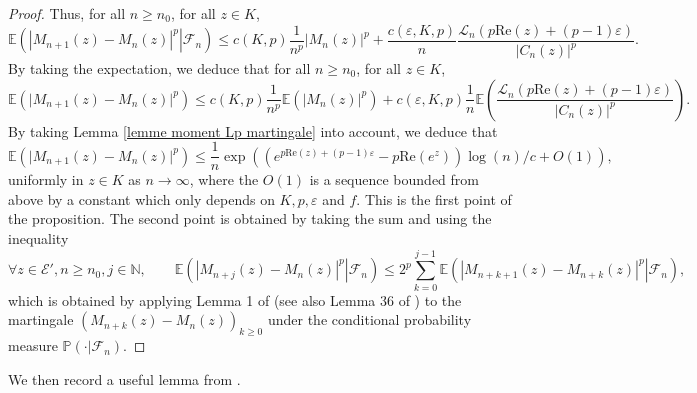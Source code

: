 \documentclass[11pt]{article}
\numberwithin{equation}{section}
\def\vp{\varepsilon}
\def \N{\mathbb{N}}
\def \cL{\mathcal{L}}
\def\E{\mathbb{E}}
\def\P{\mathbb{P}}
\renewcommand{\Re}{\mathrm{Re}}
\begin{document}
\begin{proof}
	Thus, for all $n \ge n_0$, for all $z \in K$,
	\begin{equation}\label{eq majoration moment conditionnel increment}
	\E\left( \left. \left\vert M_{n+1}(z)-M_n(z) \right\vert^p  \right\vert \mathcal{F}_n\right)\le c(K,p) \frac{1}{n^p} \vert M_n(z) \vert^p + \frac{c(\vp, K, p)}{n} \frac{\cL_n(p\Re(z)+(p-1)\vp)}{\vert C_{n}(z)\vert^p}.
	\end{equation}
	By taking the expectation, we deduce that for all $n \ge n_0$, for all $z \in K$,
	\[
	\E\left( \vert M_{n+1}(z) -M_n(z)\vert^p \right)\le c(K,p)\frac{1}{n^p}\E\left( \vert M_n(z)\vert^p \right) + c(\vp, K,p)\frac{1}{n} \E\left(\frac{\cL_n(p\Re(z)+(p-1)\vp)}{\vert C_{n}(z)\vert^p}\right).
	\]
	By taking Lemma \ref{lemme moment Lp martingale} into account, we deduce that
	\[
	\E\left(\vert M_{n+1}(z)-M_n(z)\vert^p\right) \le\frac{1}{n} \exp\left(\left(e^{p\Re(z)+(p-1)\vp} -p\Re(e^z)\right) \log(n)/c +O(1)\right),
	\]
	uniformly in $z \in K$ as $n\to \infty$, where the $O(1)$ is a sequence bounded from above by a constant which only depends on $K,p,\vp$ and $f$. This is the first point of the proposition. The second point is obtained by taking the sum and using the inequality
	\begin{equation}\label{eq lemme Biggins}
	\forall z \in \mathcal{E}', n\ge n_0,  j \in \N, \qquad\E\left(\left.\left\vert M_{n+j}(z)- M_n(z) \right\vert^p \right\vert \mathcal{F}_n \right)\le 2^p \sum_{k=0}^{j-1}  \E\left(\left. \left\vert M_{n+k+1}(z)- M_{n+k}(z) \right\vert^p \right \vert \mathcal{F}_n\right),
	\end{equation}
	which is obtained by applying Lemma 1 of \cite{Big92} (see also Lemma 36 of \cite{Sen21}) to the martingale $(M_{n+k}(z)-M_n(z))_{k\ge 0}$ under the conditional probability measure $\P(\cdot\vert \mathcal{F}_n)$.
\end{proof}
We then record a useful lemma from \cite{Sen21}.
\end{document}
